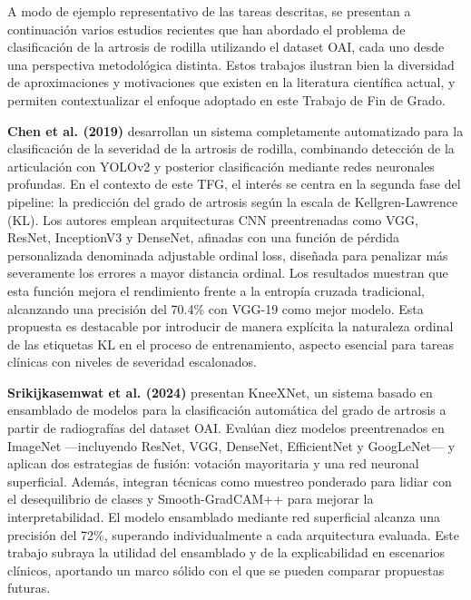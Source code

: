 \documentclass[11pt,spanish,listoffigures,listoftables]{tfgetsinf}
\begin{document}
A modo de ejemplo representativo de las tareas descritas, se presentan a continuación varios estudios recientes que han abordado el problema de clasificación de la artrosis de 
rodilla utilizando el dataset OAI, cada uno desde una perspectiva metodológica distinta. Estos trabajos ilustran bien la diversidad de aproximaciones y motivaciones que existen 
en la literatura científica actual, y permiten contextualizar el enfoque adoptado en este Trabajo de Fin de Grado.

\textbf{Chen et al. (2019)} \cite{chen2019fully} desarrollan un sistema completamente automatizado para la clasificación de la severidad de la 
artrosis de rodilla, combinando detección de la articulación con YOLOv2 y posterior clasificación mediante redes neuronales profundas. 
En el contexto de este TFG, el interés se centra en la segunda fase del pipeline: la predicción del grado de artrosis según la escala de 
Kellgren-Lawrence (KL). Los autores emplean arquitecturas CNN preentrenadas como VGG, ResNet, InceptionV3 y DenseNet, afinadas con una función de 
pérdida personalizada denominada adjustable ordinal loss, diseñada para penalizar más severamente los errores a mayor distancia ordinal. 
Los resultados muestran que esta función mejora el rendimiento frente a la entropía cruzada tradicional, alcanzando una precisión del 70.4\% con 
VGG-19 como mejor modelo. Esta propuesta es destacable por introducir de manera explícita la naturaleza ordinal de las etiquetas KL en el proceso 
de entrenamiento, aspecto esencial para tareas clínicas con niveles de severidad escalonados.

\textbf{Srikijkasemwat et al. (2024)} \cite{kneexnet2024} presentan KneeXNet, un sistema basado en ensamblado de modelos para la clasificación 
automática del grado de artrosis a partir de radiografías del dataset OAI. Evalúan diez modelos preentrenados en ImageNet —incluyendo ResNet, 
VGG, DenseNet, EfficientNet y GoogLeNet— y aplican dos estrategias de fusión: votación mayoritaria y una red neuronal superficial. Además, 
integran técnicas como muestreo ponderado para lidiar con el desequilibrio de clases y Smooth-GradCAM++ para mejorar la interpretabilidad. 
El modelo ensamblado mediante red superficial alcanza una precisión del 72\%, superando individualmente a cada arquitectura evaluada.
Este trabajo subraya la utilidad del ensamblado y de la explicabilidad en escenarios clínicos, aportando un marco sólido con el que se pueden 
comparar propuestas futuras.
\end{document}
